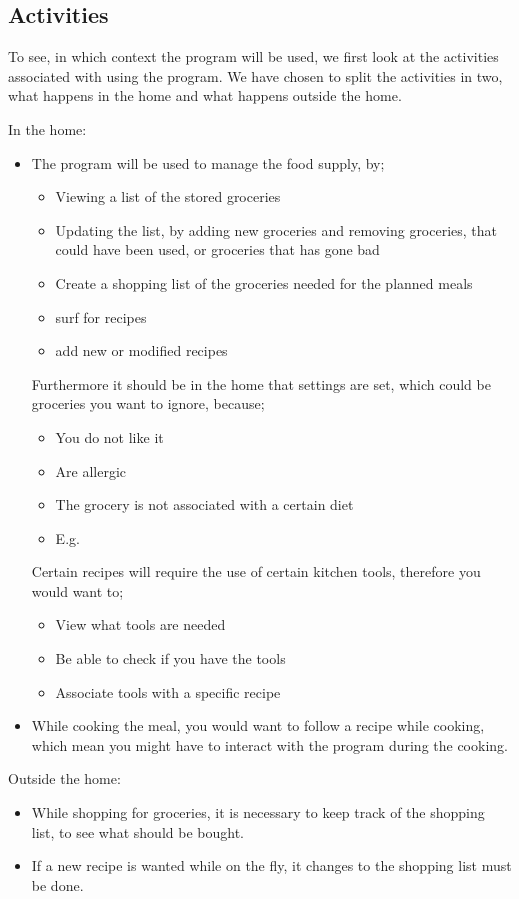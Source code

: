 \subsection{Activities}
To see, in which context the program will be used, we first look at the activities associated with using the program. We have chosen to split the activities in two, what happens in the home and what happens outside the home.

In the home:
\begin{itemize}
\item The program will be used to manage the food supply, by;
	\begin{itemize}
		\item Viewing a list of the stored groceries
		\item Updating the list, by adding new groceries and removing groceries, that could have been used, or groceries that has gone bad
		\item Create a shopping list of the groceries needed for the planned meals
		\item surf for recipes
		\item add new or modified recipes
	\end{itemize}
	Furthermore it should be in the home that settings are set, which could be groceries you want to ignore, because;
	\begin{itemize}
		\item You do not like it
		\item Are allergic
		\item The grocery is not associated with a certain diet
		\item E.g.
	\end{itemize}
	Certain recipes will require the use of certain kitchen tools, therefore you would want to;
	\begin{itemize}
		\item View what tools are needed
		\item Be able to check if you have the tools
		\item Associate tools with a specific recipe
	\end{itemize}
	\item While cooking the meal, you would want to follow a recipe while cooking, which mean you might have to interact with the program during the cooking.
\end{itemize}

Outside the home:
\begin{itemize}
\item While shopping for groceries, it is necessary to keep track of the shopping list, to see what should be bought.
\item If a new recipe is wanted while on the fly, it changes to the shopping list must be done.
\end{itemize}

